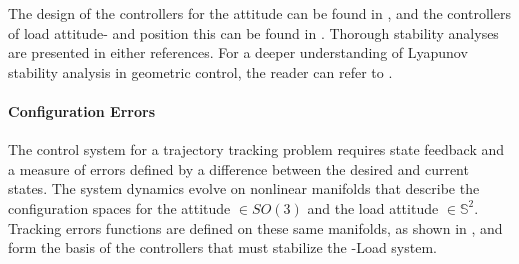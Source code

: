 The design of the controllers for the  attitude can be found in \cite{Lee2010}, and the controllers of load attitude- and position this can be found in \cite{Sreenath2013c}. Thorough stability analyses are presented in either references. For a deeper understanding of Lyapunov stability analysis in geometric control, the reader can refer to \cite{Bullo2005}.

\paragraph{Configuration Errors}\label{sec:con.errors}
The control system for a trajectory tracking problem requires state feedback and a measure of errors defined by a difference between the desired and current states.
The system dynamics evolve on nonlinear manifolds that describe the configuration spaces for the  attitude $ \in SO(3) $ and the load attitude $ \in \mathbb{S}^2 $. 
Tracking errors functions are defined on these same manifolds, as shown in \cite{Bullo2005}, and form the basis of the controllers that must stabilize the -Load system.
 

